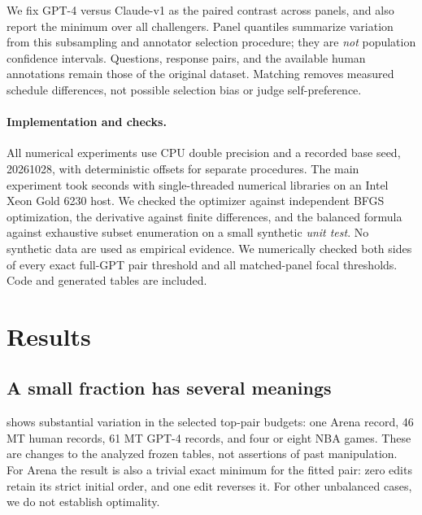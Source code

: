 \documentclass{article}
\begin{document}
We fix GPT-4 versus Claude-v1 as the paired contrast across panels, and also report the minimum over all challengers. Panel quantiles summarize variation from this subsampling and annotator selection procedure; they are \emph{not} population confidence intervals. Questions, response pairs, and the available human annotations remain those of the original dataset. Matching removes measured schedule differences, not possible selection bias or judge self-preference.

\paragraph{Implementation and checks.}
All numerical experiments use CPU double precision and a recorded base seed, 20261028, with deterministic offsets for separate procedures. The main experiment took \MainRuntime{} seconds with single-threaded numerical libraries on an Intel Xeon Gold 6230 host. We checked the optimizer against independent BFGS optimization, the derivative against finite differences, and the balanced formula against exhaustive subset enumeration on a small synthetic \emph{unit test}. No synthetic data are used as empirical evidence. We numerically checked both sides of every exact full-GPT pair threshold and all matched-panel focal thresholds. Code and generated tables are included.

\section{Results}
\begin{table}[t]
\caption{Reversal budgets and matched-budget random corruption. $K_{12}$ is the first fully refitted prefix reversing the original top pair; $K_{\rm lead}$ is the smallest found budget across challengers. These are feasible upper bounds on unbalanced data. For full MT GPT-4, both displayed refitted budgets equal the exact optimum. Random loss uses $k=K_{12}$, with 95\% Wilson intervals from 500 runs. A zero observed rate is not zero probability.}
\label{tab:radii}
\centering\small
\end{table}

\subsection{A small fraction has several meanings}
 shows substantial variation in the selected top-pair budgets: one Arena record, 46 MT human records, 61 MT GPT-4 records, and four or eight NBA games. These are changes to the analyzed frozen tables, not assertions of past manipulation. For Arena the result is also a trivial exact minimum for the fitted pair: zero edits retain its strict initial order, and one edit reverses it. For other unbalanced cases, we do not establish optimality.
\end{document}
